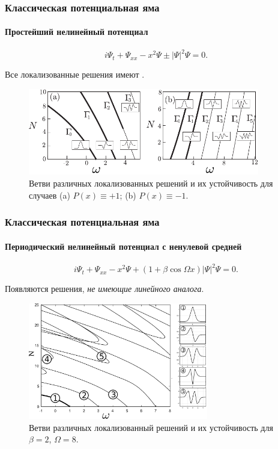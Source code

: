 \documentclass [10pt] {beamer}
\begin{document}
\begin{frame}
	\frametitle{Классическая потенциальная яма}
	\framesubtitle{Простейший нелинейный потенциал\footnotemark[7]}
	
	\begin{equation}
		i \Psi_t + \Psi_{xx} - x^2 \Psi \pm |\Psi|^2 \Psi = 0.
	\end{equation}
	
	Все локализованные решения имеют {\it {}}.
	
	\begin{figure}
		\includegraphics[width=0.9\textwidth]{pic/solution_branches_simple.pdf}
		\caption{Ветви различных локализованных решений и их устойчивость для случаев {\color{ceruleanblue} (a)} $P(x) \equiv +1$; {\color{ceruleanblue} (b)} $P(x) \equiv -1$.}
		\label{pic:branches_simple}
	\end{figure}
	
\end{frame}

\begin{frame}
	\frametitle{Классическая потенциальная яма}
	\framesubtitle{Периодический нелинейный потенциал с ненулевой средней}
	
	\begin{equation}
		i \Psi_t + \Psi_{xx} - x^2 \Psi + (1 + \beta \cos \Omega x) |\Psi|^2 \Psi = 0.
	\end{equation}

	Появляются решения, {\it не имеющие линейного аналога}.

	\begin{figure}
		\includegraphics[width=0.7\textwidth]{pic/solution_branches_nonzero_mean.pdf}
		\caption{Ветви различных локализованный решений и их устойчивость для $\beta = 2$, $\Omega = 8$.}
		\label{pic:branches_nonzero_mean}
	\end{figure}	
	
\end{frame}
\end{document}
